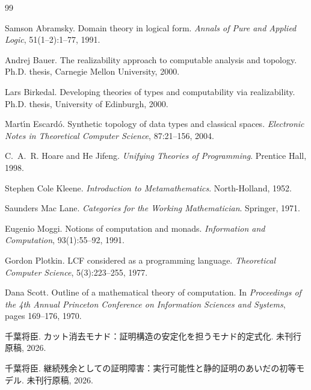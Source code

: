 \documentclass[11pt,a4paper]{article}
\theoremstyle{definition}
\begin{document}
\begin{thebibliography}{99}

Samson Abramsky.
\newblock Domain theory in logical form.
\newblock \emph{Annals of Pure and Applied Logic}, 51(1--2):1--77, 1991.

Andrej Bauer.
\newblock The realizability approach to computable analysis and topology.
\newblock Ph.D. thesis, Carnegie Mellon University, 2000.

Lars Birkedal.
\newblock Developing theories of types and computability via realizability.
\newblock Ph.D. thesis, University of Edinburgh, 2000.

Mart\'{\i}n Escard\'o.
\newblock Synthetic topology of data types and classical spaces.
\newblock \emph{Electronic Notes in Theoretical Computer Science}, 87:21--156, 2004.

C.~A.~R. Hoare and He Jifeng.
\newblock \emph{Unifying Theories of Programming}.
\newblock Prentice Hall, 1998.

Stephen Cole Kleene.
\newblock \emph{Introduction to Metamathematics}.
\newblock North-Holland, 1952.

Saunders Mac Lane.
\newblock \emph{Categories for the Working Mathematician}.
\newblock Springer, 1971.

Eugenio Moggi.
\newblock Notions of computation and monads.
\newblock \emph{Information and Computation}, 93(1):55--92, 1991.

Gordon Plotkin.
\newblock LCF considered as a programming language.
\newblock \emph{Theoretical Computer Science}, 5(3):223--255, 1977.

Dana Scott.
\newblock Outline of a mathematical theory of computation.
\newblock In \emph{Proceedings of the 4th Annual Princeton Conference
  on Information Sciences and Systems}, pages 169--176, 1970.

千葉将臣.
\newblock カット消去モナド：証明構造の安定化を担うモナド的定式化.
\newblock 未刊行原稿, 2026.

千葉将臣.
\newblock 継続残余としての証明障害：実行可能性と静的証明のあいだの初等モデル.
\newblock 未刊行原稿, 2026.

\end{thebibliography}
\end{document}
